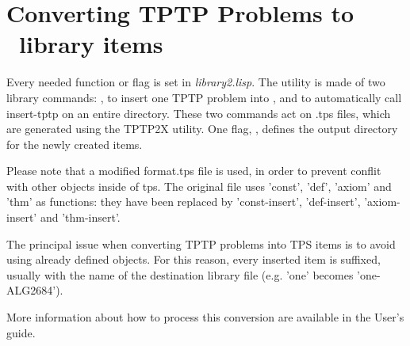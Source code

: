 \section{Converting TPTP Problems to \TPS~library items}

Every needed function or flag is set in {\it library2.lisp}. The utility is made of
two library commands: , to insert one TPTP problem into \TPS, and
 to automatically call insert-tptp on an entire directory. These
two commands act on .tps files, which are generated using the TPTP2X utility. One flag, , 
defines the output directory for the newly created items.

Please note that a modified format.tps file is used, in order to prevent
conflit with other objects inside of tps. The original file uses 'const', 'def',
'axiom' and 'thm' as functions: they have been replaced by 'const-insert',
'def-insert', 'axiom-insert' and 'thm-insert'.

The principal issue when converting TPTP problems into TPS items is to avoid
using already defined objects. For this reason, every inserted item is
suffixed, usually with the name of the destination library file (e.g. 'one'
becomes 'one-ALG2684').

More information about how to process this conversion are available in the User's guide.